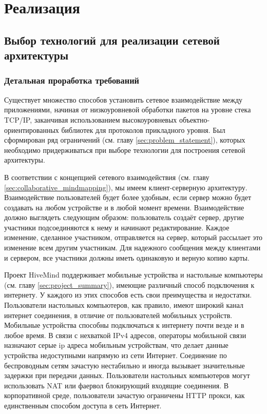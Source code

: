 \newpage

\chapter{Реализация}
\label{ch:chapter_2}

\section{Выбор технологий для реализации сетевой архитектуры}

\subsection{Детальная проработка требований}
\label{sec:detailed_requirements}
Существует множество способов установить сетевое взаимодействие между
приложениями, начиная от низкоуровневой обработки пакетов на уровне стека
TCP/IP, заканчивая использованием высокоуровневых объектно-ориентированных
библиотек для протоколов прикладного уровня. Был сформирован ряд ограничений
(см. главу \ref{sec:problem_statement}), которых необходимо придерживаться при
выборе технологии для построения сетевой архитектуры.

В соответствии с концепцией сетевого взаимодействия (см. главу
\ref{sec:collaborative_mindmapping}), мы имеем клиент-серверную архитектуру.
Взаимодействие пользователей будет более удобным, если сервер можно будет
создавать на любом устройстве и в любой момент времени. Взаимодействие должно
выглядеть следующим образом: пользователь создаёт сервер, другие участники
подсоединяются к нему и начинают редактирование. Каждое изменение, сделанное
участником, отправляется на сервер, который рассылает это изменение всем другим
участникам. Для надежного сообщения между клиентами и сервером, все участники
должны иметь одинаковую и верную копию карты.

Проект HiveMind поддерживает мобильные устройства и настольные компьютеры (см.
главу \ref{sec:project_summary}), имеющие различный способ подключения к
интернету. У каждого из этих способов есть свои преимущества и
недостатки. Пользователи настольных компьютеров, как правило, имеют широкий
канал интернет соединения, в отличие от пользователей мобильных устройств.
Мобильные устройства способны подключаться к интернету почти везде и в любое
время. В связи с нехваткой IPv4 адресов, операторы мобильной связи назначают
серые ip адреса мобильным устройствам, что делает данные устройства недоступными
напрямую из сети Интернет. Соединение по беспроводным сетям зачастую нестабильно
и иногда вызывает значительные задержки при передачи данных. Пользователи
настольных компьютеров могут использовать NAT или фаервол блокирующий
входящие соединения. В корпоративной среде, пользователи зачастую ограничены
HTTP прокси, как единственным способом доступа в сеть Интернет.

